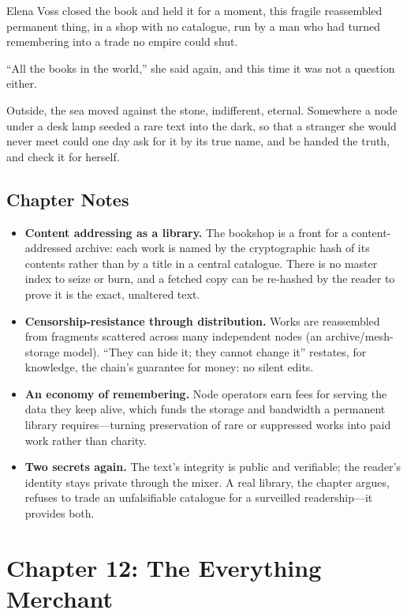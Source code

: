\documentclass[12pt,letterpaper]{book}
\providecommand{\tightlist}{\setlength{\itemsep}{0pt}\setlength{\parskip}{0pt}}
\begin{document}
Elena Voss closed the book and held it for a moment, this fragile reassembled
permanent thing, in a shop with no catalogue, run by a man who had turned
remembering into a trade no empire could shut.

``All the books in the world,'' she said again, and this time it was not a question
either.

Outside, the sea moved against the stone, indifferent, eternal. Somewhere a node
under a desk lamp seeded a rare text into the dark, so that a stranger she would
never meet could one day ask for it by its true name, and be handed the truth, and
check it for herself.

\hypertarget{chapter-11-notes}{%
\subsection{Chapter Notes}\label{chapter-11-notes}}

\begin{itemize}
\tightlist
\item
  \textbf{Content addressing as a library.} The bookshop is a front for a
  content-addressed archive: each work is named by the cryptographic hash of its
  contents rather than by a title in a central catalogue. There is no master index
  to seize or burn, and a fetched copy can be re-hashed by the reader to prove it
  is the exact, unaltered text.
\item
  \textbf{Censorship-resistance through distribution.} Works are reassembled from
  fragments scattered across many independent nodes (an archive/mesh-storage
  model). ``They can hide it; they cannot change it'' restates, for knowledge, the
  chain's guarantee for money: no silent edits.
\item
  \textbf{An economy of remembering.} Node operators earn fees for serving the
  data they keep alive, which funds the storage and bandwidth a permanent library
  requires---turning preservation of rare or suppressed works into paid work
  rather than charity.
\item
  \textbf{Two secrets again.} The text's integrity is public and verifiable; the
  reader's identity stays private through the mixer. A real library, the chapter
  argues, refuses to trade an unfalsifiable catalogue for a surveilled
  readership---it provides both.
\end{itemize}


\hypertarget{chapter-12-the-everything-merchant}{%
\section{Chapter 12: The Everything
Merchant}\label{chapter-12-the-everything-merchant}}
\end{document}
